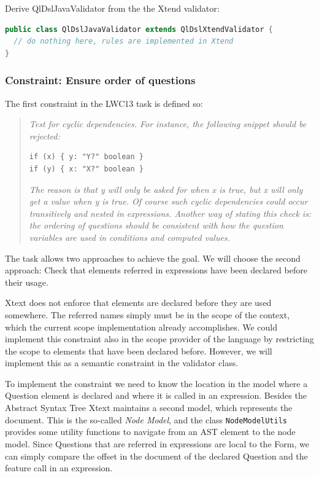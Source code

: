 Derive QlDslJavaValidator from the the Xtend validator:

\begin{lstlisting}[language=Java]
public class QlDslJavaValidator extends QlDslXtendValidator {
  // do nothing here, rules are implemented in Xtend
}
\end{lstlisting}

\subsubsection{Constraint: Ensure order of questions}

The first constraint in the LWC13 task is defined so:

\begin{quote}
\emph{
Test for cyclic dependencies. For instance, the following snippet should be rejected:
}
\begin{lstlisting}[language=QL]
if (x) { y: "Y?" boolean }
if (y) { x: "X?" boolean }
\end{lstlisting}

\emph{The reason is that y will only be asked for when x is true, but x will only get a value when y is true. 
Of course such cyclic dependencies could occur transitively and nested in expressions. 
Another way of stating this check is: the ordering of questions should be
consistent with how the question variables are used in conditions and computed values. 
}
\end{quote}

The task allows two approaches to achieve the goal. We will choose the second
approach: Check that elements referred in expressions have been declared before
their usage.

Xtext does not enforce that elements are declared before they are used
somewhere. The referred names simply must be in the scope of the context, which
the current scope implementation already accomplishes. We could implement this
constraint also in the scope provider of the language by restricting the scope
to elements that have been declared before. However, we will implement this as a
semantic constraint in the validator class.

To implement the constraint we need to know the location in the model where a
Question element is declared and where it is called in an expression. Besides
the Abstract Syntax Tree Xtext maintains a second model, which represents the
document. This is the so-called \emph{Node Model}, and the class
\texttt{NodeModelUtils} provides some utility functions to navigate from an AST
element to the node model. Since Questions that are referred in expressions are
local to the Form, we can simply compare the offset in the document of the
declared Question and the feature call in an expression.

